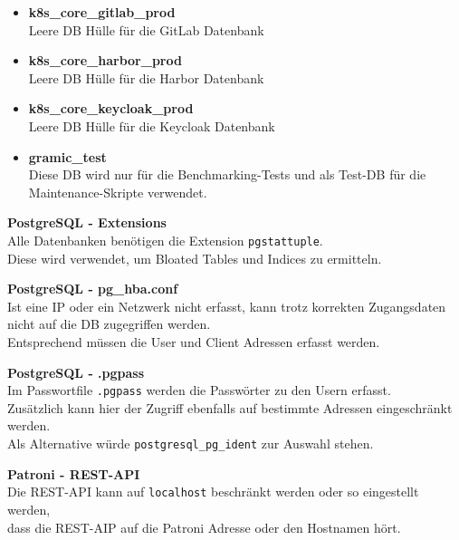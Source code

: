 \begin{flushleft}
\begin{description}
\begin{itemize}
            \item \textbf{k8s\_core\_gitlab\_prod}\hfill \\Leere DB Hülle für die \Gls{GitLab} Datenbank
            \item \textbf{k8s\_core\_harbor\_prod}\hfill \\Leere DB Hülle für die \Gls{Harbor} Datenbank
            \item \textbf{k8s\_core\_keycloak\_prod}\hfill \\Leere DB Hülle für die \Gls{Keycloak} Datenbank
            \item \textbf{gramic\_test}\hfill \\Diese DB wird nur für die Benchmarking-Tests und als Test-DB für die Maintenance-Skripte verwendet.
        \end{itemize}
        \item \textbf{PostgreSQL - Extensions}\hfill \\Alle Datenbanken benötigen die Extension \texttt{pgstattuple}.\\Diese wird verwendet, um Bloated Tables und Indices zu ermitteln.
        \item \textbf{PostgreSQL - pg\_hba.conf}\hfill \\Ist eine IP oder ein Netzwerk nicht erfasst, kann trotz korrekten Zugangsdaten nicht auf die DB zugegriffen werden.\\Entsprechend müssen die User und Client Adressen erfasst werden.
        \item \textbf{PostgreSQL - .pgpass}\hfill \\Im Passwortfile \texttt{.pgpass} werden die Passwörter zu den Usern erfasst.\\Zusätzlich kann hier der Zugriff ebenfalls auf bestimmte Adressen eingeschränkt werden.\\Als Alternative würde \texttt{postgresql\_pg\_ident} zur Auswahl stehen.
        \item \textbf{Patroni - REST-API}\hfill \\Die REST-API kann auf \texttt{localhost} beschränkt werden oder so eingestellt werden,\\dass die REST-AIP auf die Patroni Adresse oder den Hostnamen hört.
    \end{description}
\end{flushleft}
